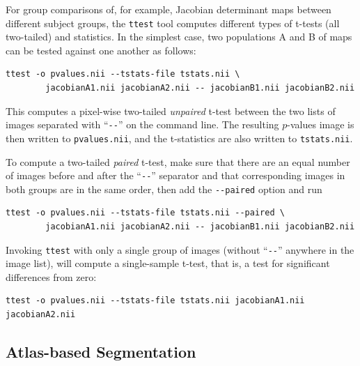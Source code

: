 \documentclass{InsightArticle}
\begin{document}
For group comparisons of, for example, Jacobian determinant maps between
different subject groups, the \verb|ttest| tool  computes different types of t-tests (all
two-tailed) and statistics. In the simplest case, two populations A and B of
maps can be tested against one another as follows:
\begin{verbatim}
ttest -o pvalues.nii --tstats-file tstats.nii \
        jacobianA1.nii jacobianA2.nii -- jacobianB1.nii jacobianB2.nii
\end{verbatim} 
This computes a pixel-wise two-tailed {\em unpaired\/} t-test between the two
lists of images separated with ``\verb|--|'' on the command line. The
resulting $p$-values image is then written to \verb|pvalues.nii|, and the
t-statistics are also written to \verb|tstats.nii|.

To compute a two-tailed {\em paired\/} t-test, make sure that there are an
equal number of images before and after the ``\verb|--|'' separator and that
corresponding images in both groups are in the same order, then add the
\verb|--paired| option and run
\begin{verbatim}
ttest -o pvalues.nii --tstats-file tstats.nii --paired \
        jacobianA1.nii jacobianA2.nii -- jacobianB1.nii jacobianB2.nii
\end{verbatim}
Invoking \verb|ttest| with only a single group of images (without
``\verb|--|'' anywhere in the image list), will compute a single-sample
t-test, that is, a test for significant differences from zero:
\begin{verbatim}
ttest -o pvalues.nii --tstats-file tstats.nii jacobianA1.nii jacobianA2.nii
\end{verbatim} 


\subsection{Atlas-based Segmentation}
\end{document}
